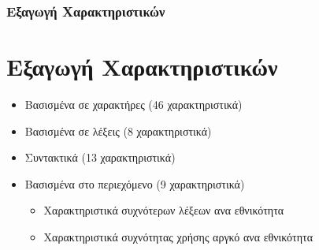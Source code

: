 \documentclass{beamer}
\begin{document}
\begin{frame}
	\frametitle{Εξαγωγή Χαρακτηριστικών}
	\section{Εξαγωγή Χαρακτηριστικών}
		\begin{itemize}
			\item Βασισμένα σε χαρακτήρες (46 χαρακτηριστικά)\linebreak
			\item Βασισμένα σε λέξεις (8 χαρακτηριστικά)\linebreak
			\item Συντακτικά (13 χαρακτηριστικά)\linebreak
			\item Βασισμένα στο περιεχόμενο (9 χαρακτηριστικά)
				\begin{itemize}
					\item Χαρακτηριστικά συχνότερων λέξεων ανα εθνικότητα
					\item Χαρακτηριστικά συχνότητας χρήσης αργκό ανα εθνικότητα
				\end{itemize}
		\end{itemize}
\end{frame}
\end{document}
